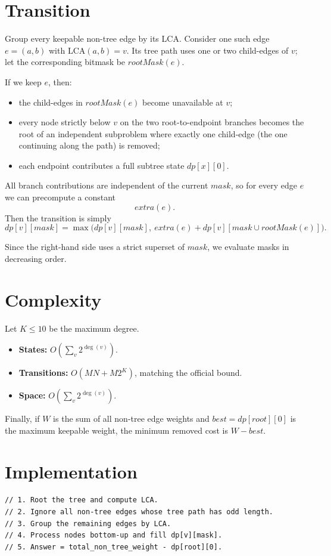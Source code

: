 \documentclass[11pt,a4paper]{article}
\begin{document}
\section{Transition}
Group every keepable non-tree edge by its LCA.
Consider one such edge $e=(a,b)$ with $\mathrm{LCA}(a,b)=v$.
Its tree path uses one or two child-edges of $v$; let the corresponding bitmask be
$rootMask(e)$.

If we keep $e$, then:
\begin{itemize}
  \item the child-edges in $rootMask(e)$ become unavailable at $v$;
  \item every node strictly below $v$ on the two root-to-endpoint branches becomes the root of
        an independent subproblem where exactly one child-edge (the one continuing along the path)
        is removed;
  \item each endpoint contributes a full subtree state $dp[x][0]$.
\end{itemize}

All branch contributions are independent of the current $mask$, so for every edge $e$ we can
precompute a constant
\[
extra(e).
\]
Then the transition is simply
\[
dp[v][mask] = \max\bigl(dp[v][mask],\ extra(e) + dp[v][mask \cup rootMask(e)]\bigr).
\]

Since the right-hand side uses a strict superset of $mask$, we evaluate masks in decreasing order.

\section{Complexity}
Let $K \le 10$ be the maximum degree.
\begin{itemize}
  \item \textbf{States:} $O\!\left(\sum_v 2^{\deg(v)}\right)$.
  \item \textbf{Transitions:} $O(MN + M2^K)$, matching the official bound.
  \item \textbf{Space:} $O\!\left(\sum_v 2^{\deg(v)}\right)$.
\end{itemize}

Finally, if $W$ is the sum of all non-tree edge weights and $best = dp[root][0]$ is the
maximum keepable weight, the minimum removed cost is $W - best$.

\section{Implementation}
\begin{lstlisting}
// 1. Root the tree and compute LCA.
// 2. Ignore all non-tree edges whose tree path has odd length.
// 3. Group the remaining edges by LCA.
// 4. Process nodes bottom-up and fill dp[v][mask].
// 5. Answer = total_non_tree_weight - dp[root][0].
\end{lstlisting}
\end{document}
